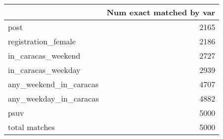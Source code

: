 \begin{tabular}{lr}
\toprule
{} &  Num exact matched by var \\
\midrule
post                   &                      2165 \\
registration\_female    &                      2186 \\
in\_caracas\_weekend     &                      2727 \\
in\_caracas\_weekday     &                      2939 \\
any\_weekend\_in\_caracas &                      4707 \\
any\_weekday\_in\_caracas &                      4882 \\
psuv                   &                      5000 \\
total matches          &                      5000 \\
\bottomrule
\end{tabular}
